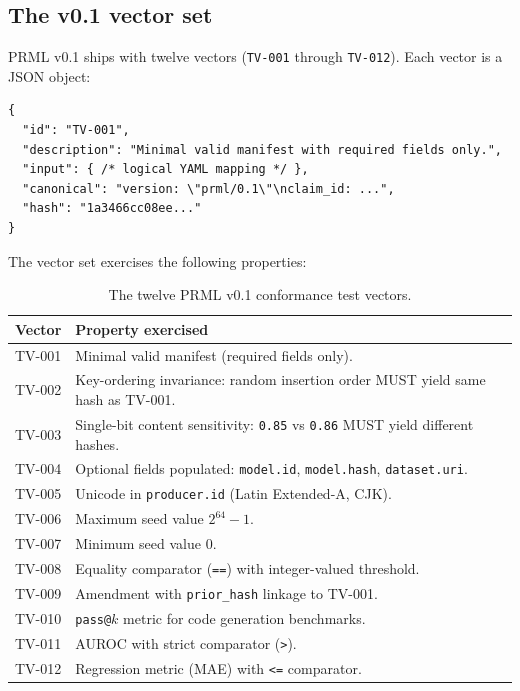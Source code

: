 \documentclass[11pt, a4paper]{article}
\begin{document}
\subsection{The v0.1 vector set}

PRML v0.1 ships with twelve vectors (\texttt{TV-001} through \texttt{TV-012}). Each vector is a JSON object:

\begin{lstlisting}[caption={A single test vector entry.}]
{
  "id": "TV-001",
  "description": "Minimal valid manifest with required fields only.",
  "input": { /* logical YAML mapping */ },
  "canonical": "version: \"prml/0.1\"\nclaim_id: ...",
  "hash": "1a3466cc08ee..."
}
\end{lstlisting}

The vector set exercises the following properties:

\begin{table}[h]
\centering
\small
\begin{tabular}{@{}l l@{}}
\toprule
Vector & Property exercised \\
\midrule
TV-001 & Minimal valid manifest (required fields only). \\
TV-002 & Key-ordering invariance: random insertion order MUST yield same hash as TV-001. \\
TV-003 & Single-bit content sensitivity: \texttt{0.85} vs \texttt{0.86} MUST yield different hashes. \\
TV-004 & Optional fields populated: \texttt{model.id}, \texttt{model.hash}, \texttt{dataset.uri}. \\
TV-005 & Unicode in \texttt{producer.id} (Latin Extended-A, CJK). \\
TV-006 & Maximum seed value $2^{64} - 1$. \\
TV-007 & Minimum seed value $0$. \\
TV-008 & Equality comparator (\texttt{==}) with integer-valued threshold. \\
TV-009 & Amendment with \texttt{prior\_hash} linkage to TV-001. \\
TV-010 & \texttt{pass@}$k$ metric for code generation benchmarks. \\
TV-011 & AUROC with strict comparator (\texttt{>}). \\
TV-012 & Regression metric (MAE) with \texttt{<=} comparator. \\
\bottomrule
\end{tabular}
\caption{The twelve PRML v0.1 conformance test vectors.}
\label{tab:vectors}
\end{table}
\end{document}
